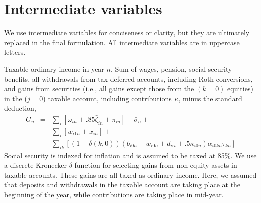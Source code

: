 \documentclass{report}[fleqn,12pt]
\begin{document}
\section{Intermediate variables}
We use intermediate variables for conciseness or clarity,
but they are ultimately replaced in the final formulation.
All intermediate variables are in uppercase letters.
\begin{description}[leftmargin=4em,style=multiline]
\item [$G_n$]
	Taxable ordinary income in year $n$. Sum of wages, pension, social security benefits, all withdrawals
	from tax-deferred accounts, including Roth conversions, and gains from securities
	(i.e., all gains except those from the $(k=0)$ equities)
	in the ($j=0$) taxable account, including contributions $\kappa$, minus the standard deduction,
	\begin{eqnarray}
		\label{Eq:Tx2}
		G_n &=& 
		\sum_{i} [\omega_{in} + .85\bar\zeta_{in} + \pi_{in}]
		- \bar{\sigma}_n +
		\nonumber \\
		&& \sum_{i} [w_{i1n} + x_{in}] +
		\nonumber \\
		&& \sum_{ik} 
		[(1-\delta(k, 0))(b_{i0n} - w_{i0n} + d_{in} + .5\kappa_{i0n})\alpha_{i0kn}\tau_{kn}]
	\end{eqnarray}
	Social security is indexed for inflation and is assumed to be taxed at 85\%.
	We use a discrete Kronecker $\delta$ function for selecting gains from non-equity assets in
	taxable accounts. These gains are all taxed as ordinary income. Here, we assumed that
	deposits and withdrawals in the taxable account are taking place at the beginning of the year, while
	contributions are taking place in mid-year.


\end{description}
\end{document}

